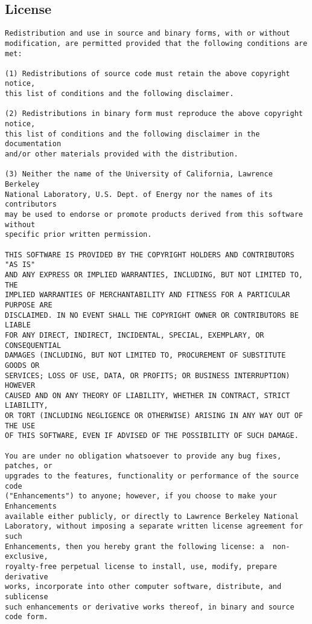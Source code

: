 \documentclass[a4paper]{article}
\begin{document}
\subsection{License}
\begin{lstlisting}[frame=single]
Redistribution and use in source and binary forms, with or without
modification, are permitted provided that the following conditions are met:
 
(1) Redistributions of source code must retain the above copyright notice,
this list of conditions and the following disclaimer.
 
(2) Redistributions in binary form must reproduce the above copyright notice,
this list of conditions and the following disclaimer in the documentation
and/or other materials provided with the distribution.
 
(3) Neither the name of the University of California, Lawrence Berkeley
National Laboratory, U.S. Dept. of Energy nor the names of its contributors
may be used to endorse or promote products derived from this software without
specific prior written permission.
 
THIS SOFTWARE IS PROVIDED BY THE COPYRIGHT HOLDERS AND CONTRIBUTORS "AS IS"
AND ANY EXPRESS OR IMPLIED WARRANTIES, INCLUDING, BUT NOT LIMITED TO, THE
IMPLIED WARRANTIES OF MERCHANTABILITY AND FITNESS FOR A PARTICULAR PURPOSE ARE
DISCLAIMED. IN NO EVENT SHALL THE COPYRIGHT OWNER OR CONTRIBUTORS BE LIABLE
FOR ANY DIRECT, INDIRECT, INCIDENTAL, SPECIAL, EXEMPLARY, OR CONSEQUENTIAL
DAMAGES (INCLUDING, BUT NOT LIMITED TO, PROCUREMENT OF SUBSTITUTE GOODS OR
SERVICES; LOSS OF USE, DATA, OR PROFITS; OR BUSINESS INTERRUPTION) HOWEVER
CAUSED AND ON ANY THEORY OF LIABILITY, WHETHER IN CONTRACT, STRICT LIABILITY,
OR TORT (INCLUDING NEGLIGENCE OR OTHERWISE) ARISING IN ANY WAY OUT OF THE USE
OF THIS SOFTWARE, EVEN IF ADVISED OF THE POSSIBILITY OF SUCH DAMAGE.

You are under no obligation whatsoever to provide any bug fixes, patches, or
upgrades to the features, functionality or performance of the source code
("Enhancements") to anyone; however, if you choose to make your Enhancements
available either publicly, or directly to Lawrence Berkeley National
Laboratory, without imposing a separate written license agreement for such
Enhancements, then you hereby grant the following license: a  non-exclusive,
royalty-free perpetual license to install, use, modify, prepare derivative
works, incorporate into other computer software, distribute, and sublicense
such enhancements or derivative works thereof, in binary and source code form.


\end{lstlisting}
\end{document}

